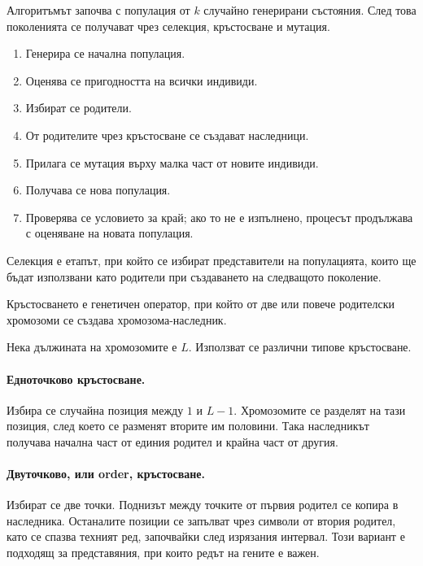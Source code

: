 Алгоритъмът започва с популация от $k$ случайно генерирани състояния. След това поколенията се получават чрез селекция, кръстосване и мутация.

\begin{enumerate}
\item Генерира се начална популация.
\item Оценява се пригодността на всички индивиди.
\item Избират се родители.
\item От родителите чрез кръстосване се създават наследници.
\item Прилага се мутация върху малка част от новите индивиди.
\item Получава се нова популация.
\item Проверява се условието за край; ако то не е изпълнено, процесът продължава с оценяване на новата популация.
\end{enumerate}

\begin{defn}[Селекция]
Селекция е етапът, при който се избират представители на популацията, които ще бъдат използвани като родители при създаването на следващото поколение.
\end{defn}

\begin{defn}[Кръстосване]
Кръстосването е генетичен оператор, при който от две или повече родителски хромозоми се създава хромозома-наследник.
\end{defn}

Нека дължината на хромозомите е $L$. Използват се различни типове кръстосване.

\paragraph{Едноточково кръстосване.}
Избира се случайна позиция между $1$ и $L-1$. Хромозомите се разделят на тази позиция, след което се разменят вторите им половини. Така наследникът получава начална част от единия родител и крайна част от другия.

\paragraph{Двуточково, или order, кръстосване.}
Избират се две точки. Поднизът между точките от първия родител се копира в наследника. Останалите позиции се запълват чрез символи от втория родител, като се спазва техният ред, започвайки след изрязания интервал. Този вариант е подходящ за представяния, при които редът на гените е важен.

